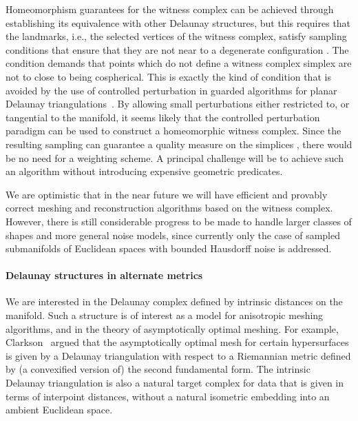 Homeomorphism guarantees for the witness complex can be achieved
through establishing its equivalence with other Delaunay structures,
but this requires that the landmarks, i.e., the selected vertices of
the witness complex, satisfy sampling conditions that ensure that they
are not near to a degenerate configuration
\cite{boissonnat2011cgl,boissonnat2012stab}.  The condition demands
that points which do not define a witness complex simplex are not to
close to being cospherical. This is exactly the kind of condition that
is avoided by the use of controlled perturbation in guarded algorithms
for planar Delaunay triangulations~\cite{funke2005cp}. By allowing
small perturbations either restricted to, or tangential to the
manifold, it seems likely that the controlled perturbation paradigm can
be used to construct a homeomorphic witness complex. Since the
resulting sampling can guarantee a quality measure on the simplices
\cite{boissonnat2012stab}, there would be no need for a weighting
scheme.  A principal challenge will be to achieve such an algorithm
without introducing expensive geometric predicates.

We are optimistic that in the near future we will have efficient and
provably correct meshing and reconstruction algorithms based on the
witness complex.  However, there is still considerable progress to be
made to handle larger classes of shapes and more general noise models,
since currently only the case of sampled submanifolds of Euclidean
spaces with bounded Hausdorff noise is addressed.


\paragraph{Delaunay structures in alternate metrics}
We are interested in the Delaunay complex defined by intrinsic
distances on the manifold. Such a structure is of interest as a model
for anisotropic meshing algorithms, and in the theory of
asymptotically optimal meshing. For example,
Clarkson~\cite{clarkson2006} argued that the asymptotically optimal
mesh for certain hypersurfaces is given by a Delaunay triangulation
with respect to a Riemannian metric defined by (a convexified version
of) the second fundamental form. The intrinsic Delaunay triangulation
is also a natural target complex for data that is given in terms of
interpoint distances, without a natural isometric embedding into an
ambient Euclidean space.

